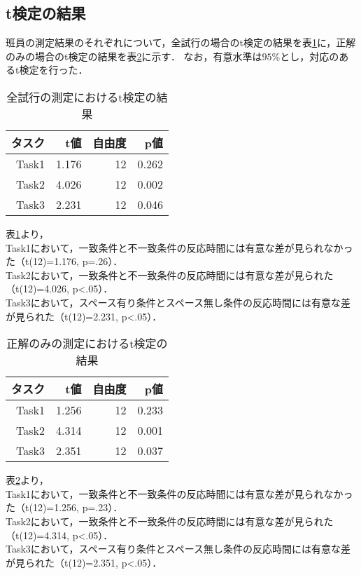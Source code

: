 \documentclass{jlreq}
\numberwithin{equation}{section}
\begin{document}
\subsection{t検定の結果}

班員の測定結果のそれぞれについて，全試行の場合のt検定の結果を表\ref{tab:t_all}に，正解のみの場合のt検定の結果を表\ref{tab:t_correct_only}に示す．
なお，有意水準は$95\si{\percent}$とし，対応のあるt検定を行った．

\begin{table}[H]
  \centering
  \caption{全試行の測定におけるt検定の結果}
  \begin{tabular}{|r|r|r|r|}
    \hline
    タスク & t値   & 自由度 & p値   \\ \hline
    Task1  & 1.176 & 12     & 0.262 \\ \hline
    Task2  & 4.026 & 12     & 0.002 \\ \hline
    Task3  & 2.231 & 12     & 0.046 \\ \hline
  \end{tabular}
  \label{tab:t_all}
\end{table}

表\ref{tab:t_all}より，\\
Task1において，一致条件と不一致条件の反応時間には有意な差が見られなかった（t(12)=1.176, p=.26）．\\
Task2において，一致条件と不一致条件の反応時間には有意な差が見られた（t(12)=4.026, p<.05）．\\
Task3において，スペース有り条件とスペース無し条件の反応時間には有意な差が見られた（t(12)=2.231, p<.05）．

\begin{table}[H]
  \centering
  \caption{正解のみの測定におけるt検定の結果}
  \begin{tabular}{|r|r|r|r|}
    \hline
    タスク & t値   & 自由度 & p値   \\ \hline
    Task1  & 1.256 & 12     & 0.233 \\ \hline
    Task2  & 4.314 & 12     & 0.001 \\ \hline
    Task3  & 2.351 & 12     & 0.037 \\ \hline
  \end{tabular}
  \label{tab:t_correct_only}
\end{table}

表\ref{tab:t_correct_only}より，\\
Task1において，一致条件と不一致条件の反応時間には有意な差が見られなかった（t(12)=1.256, p=.23）．\\
Task2において，一致条件と不一致条件の反応時間には有意な差が見られた（t(12)=4.314, p<.05）．\\
Task3において，スペース有り条件とスペース無し条件の反応時間には有意な差が見られた（t(12)=2.351, p<.05）．
\end{document}
